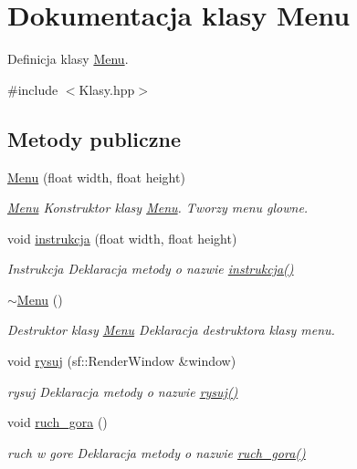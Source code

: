\hypertarget{class_menu}{\section{Dokumentacja klasy Menu}
\label{class_menu}
}


Definicja klasy \hyperlink{class_menu}{Menu}.  




{\ttfamily \#include $<$Klasy.\+hpp$>$}

\subsection*{Metody publiczne}
\begin{DoxyCompactItemize}
\item 
\hyperlink{class_menu_a8caa6100506d4b8e0d782e550dbc470e}{Menu} (float width, float height)
\begin{DoxyCompactList}\small\item\em \hyperlink{class_menu}{Menu} Konstruktor klasy \hyperlink{class_menu}{Menu}. Tworzy menu glowne. \end{DoxyCompactList}\item 
void \hyperlink{class_menu_a1b1cedd490fafb85770274b924431bbd}{instrukcja} (float width, float height)
\begin{DoxyCompactList}\small\item\em Instrukcja Deklaracja metody o nazwie \hyperlink{class_menu_a1b1cedd490fafb85770274b924431bbd}{instrukcja()} \end{DoxyCompactList}\item 
\hyperlink{class_menu_a831387f51358cfb88cd018e1777bc980}{$\sim$\+Menu} ()
\begin{DoxyCompactList}\small\item\em Destruktor klasy \hyperlink{class_menu}{Menu} Deklaracja destruktora klasy menu. \end{DoxyCompactList}\item 
void \hyperlink{class_menu_aff074d199701078a4c33e5b6287b9b5b}{rysuj} (sf\+::\+Render\+Window \&window)
\begin{DoxyCompactList}\small\item\em rysuj Deklaracja metody o nazwie \hyperlink{class_menu_aff074d199701078a4c33e5b6287b9b5b}{rysuj()} \end{DoxyCompactList}\item 
void \hyperlink{class_menu_afca82431acd35bfe14e7204191493cc9}{ruch\+\_\+gora} ()
\begin{DoxyCompactList}\small\item\em ruch w gore Deklaracja metody o nazwie \hyperlink{class_menu_afca82431acd35bfe14e7204191493cc9}{ruch\+\_\+gora()} \end{DoxyCompactList}\item 

\end{DoxyCompactItemize}
